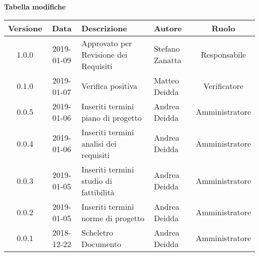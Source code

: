 \begin{center}
	\textbf{Tabella modifiche}
	\end{center}
	\begin{center}
		\begin{tabularx}{\textwidth}{|c|c|X|X|c|}
			\hline
			\textbf{Versione} & \textbf{Data} & \textbf{Descrizione} & \textbf{Autore} & \textbf{Ruolo} \\
			\hline
			1.0.0 & 2019-01-09 & Approvato per Revisione dei Requisiti & Stefano Zanatta & Responsabile\\
			\hline
			0.1.0 & 2019-01-07 & Verifica positiva & Matteo Deidda & Verificatore\\
			\hline
			0.0.5 & 2019-01-06 & Inseriti termini piano di progetto & Andrea Deidda & Amministratore\\
			\hline
			0.0.4 & 2019-01-06 & Inseriti termini analisi dei requisiti & Andrea Deidda & Amministratore\\
			\hline
			0.0.3 & 2019-01-05 & Inseriti termini studio di fattibilità & Andrea Deidda & Amministratore\\
			\hline
			0.0.2 & 2019-01-05 & Inseriti termini norme di progetto & Andrea Deidda & Amministratore\\
			\hline
			0.0.1 & 2018-12-22 & Scheletro Documento & Andrea Deidda & Amministratore\\
			\hline
		\end{tabularx}
	\end{center}
\newpage